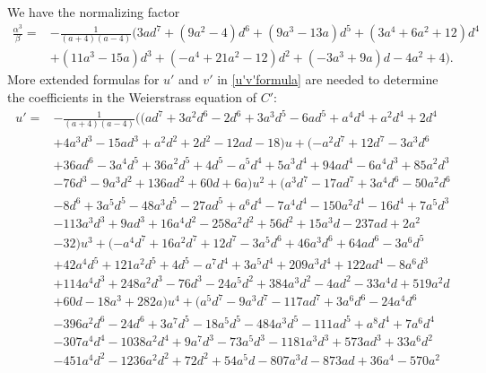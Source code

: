 \documentclass{gtpart}
\theoremstyle{definition}
\theoremstyle{remark}
\newcommand{\A}{\alpha}
\begin{document}
We have the normalizing factor 
\begin{equation*}
\begin{split}
 \frac{\A^3}{\beta} = & -\frac{1}{(a + 4) (a - 4)} \big( 3 a d^7 + (9 a^2 - 4) d^6 + (9 a^3 - 13 a) d^5 + (3 a^4 + 6 a^2 + 12) d^4 \\
                      & + (11 a^3 - 15 a) d^3 + (-a^4 + 21 a^2 - 12) d^2 + (-3 a^3 + 9 a) d - 4 a^2 + 4 \big).  
\end{split}
\end{equation*}
More extended formulas for $u'$ and $v'$ in \eqref{u'v'formula} are needed to determine the coefficients in the Weierstrass equation of $C'$: 
\begin{equation*}
\begin{split}
 u' = & -\frac{1}{(a + 4) (a - 4)} \big( (a d^7 + 3 a^2 d^6 - 2 d^6 + 3 a^3 d^5 - 6 a d^5 + a^4 d^4 + a^2 d^4 + 2 d^4 \\
      & + 4 a^3 d^3 - 15 a d^3 + a^2 d^2 + 2 d^2 - 12 a d - 18) u + (-a^2 d^7 + 12 d^7 - 3 a^3 d^6 \\
      & + 36 a d^6 - 3 a^4 d^5 + 36 a^2 d^5 + 4 d^5 - a^5 d^4 + 5 a^3 d^4 + 94 a d^4 - 6 a^4 d^3 + 85 a^2 d^3 \\
      & - 76 d^3 - 9 a^3 d^2 + 136 a d^2 + 60 d + 6 a) u^2 + (a^3 d^7 - 17 a d^7 + 3 a^4 d^6 - 50 a^2 d^6 \\
      & - 8 d^6 + 3 a^5 d^5 - 48 a^3 d^5 - 27 a d^5 + a^6 d^4 - 7 a^4 d^4 - 150 a^2 d^4 - 16 d^4 + 7 a^5 d^3 \\
      & - 113 a^3 d^3 + 9 a d^3 + 16 a^4 d^2 - 258 a^2 d^2 + 56 d^2 + 15 a^3 d - 237 a d+2 a^2 \\
      & - 32) u^3 + (-a^4 d^7 + 16 a^2 d^7 + 12 d^7 - 3 a^5 d^6 + 46 a^3 d^6 + 64 a d^6 - 3 a^6 d^5 \\
      & + 42 a^4 d^5 + 121 a^2 d^5 + 4 d^5 - a^7 d^4 + 3 a^5 d^4 + 209 a^3 d^4 + 122 a d^4 - 8 a^6 d^3 \\
      & + 114 a^4 d^3 + 248 a^2 d^3 - 76 d^3 - 24 a^5 d^2 + 384 a^3 d^2 - 4 a d^2 - 33 a^4 d + 519 a^2 d \\
      & + 60 d - 18 a^3 + 282 a) u^4 + (a^5 d^7 - 9 a^3 d^7 - 117 a d^7 + 3 a^6 d^6 - 24 a^4 d^6 \\
      & - 396 a^2 d^6 - 24 d^6 + 3 a^7 d^5 - 18 a^5 d^5 - 484 a^3 d^5 - 111 a d^5 + a^8 d^4 + 7 a^6 d^4 \\
      & - 307 a^4 d^4 - 1038 a^2 d^4 + 9 a^7 d^3 - 73 a^5 d^3 - 1181 a^3 d^3 + 573 a d^3 + 33 a^6 d^2 \\
      & - 451 a^4 d^2 - 1236 a^2 d^2 + 72 d^2 + 54 a^5 d - 807 a^3 d - 873 a d + 36 a^4 - 570 a^2 \\

\end{split}
\end{equation*}
\end{document}
